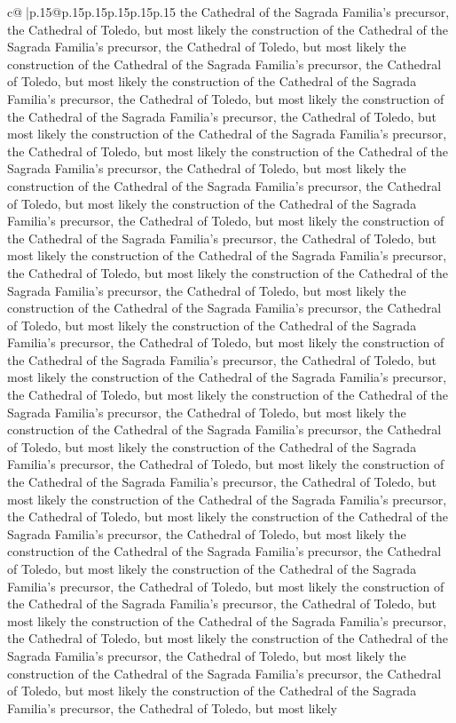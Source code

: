 \documentclass{article}
\begin{document}
{\begin{supertabular}{c@{$\;$}|p{.15\linewidth}@{}p{.15\linewidth}p{.15\linewidth}p{.15\linewidth}p{.15\linewidth}p{.15\linewidth}}
{{{the Cathedral of the Sagrada Familia's precursor, the Cathedral of Toledo, but most likely the construction of the Cathedral of the Sagrada Familia's precursor, the Cathedral of Toledo, but most likely the construction of the Cathedral of the Sagrada Familia's precursor, the Cathedral of Toledo, but most likely the construction of the Cathedral of the Sagrada Familia's precursor, the Cathedral of Toledo, but most likely the construction of the Cathedral of the Sagrada Familia's precursor, the Cathedral of Toledo, but most likely the construction of the Cathedral of the Sagrada Familia's precursor, the Cathedral of Toledo, but most likely the construction of the Cathedral of the Sagrada Familia's precursor, the Cathedral of Toledo, but most likely the construction of the Cathedral of the Sagrada Familia's precursor, the Cathedral of Toledo, but most likely the construction of the Cathedral of the Sagrada Familia's precursor, the Cathedral of Toledo, but most likely the construction of the Cathedral of the Sagrada Familia's precursor, the Cathedral of Toledo, but most likely the construction of the Cathedral of the Sagrada Familia's precursor, the Cathedral of Toledo, but most likely the construction of the Cathedral of the Sagrada Familia's precursor, the Cathedral of Toledo, but most likely the construction of the Cathedral of the Sagrada Familia's precursor, the Cathedral of Toledo, but most likely the construction of the Cathedral of the Sagrada Familia's precursor, the Cathedral of Toledo, but most likely the construction of the Cathedral of the Sagrada Familia's precursor, the Cathedral of Toledo, but most likely the construction of the Cathedral of the Sagrada Familia's precursor, the Cathedral of Toledo, but most likely the construction of the Cathedral of the Sagrada Familia's precursor, the Cathedral of Toledo, but most likely the construction of the Cathedral of the Sagrada Familia's precursor, the Cathedral of Toledo, but most likely the construction of the Cathedral of the Sagrada Familia's precursor, the Cathedral of Toledo, but most likely the construction of the Cathedral of the Sagrada Familia's precursor, the Cathedral of Toledo, but most likely the construction of the Cathedral of the Sagrada Familia's precursor, the Cathedral of Toledo, but most likely the construction of the Cathedral of the Sagrada Familia's precursor, the Cathedral of Toledo, but most likely the construction of the Cathedral of the Sagrada Familia's precursor, the Cathedral of Toledo, but most likely the construction of the Cathedral of the Sagrada Familia's precursor, the Cathedral of Toledo, but most likely the construction of the Cathedral of the Sagrada Familia's precursor, the Cathedral of Toledo, but most likely the construction of the Cathedral of the Sagrada Familia's precursor, the Cathedral of Toledo, but most likely the construction of the Cathedral of the Sagrada Familia's precursor, the Cathedral of Toledo, but most likely the construction of the Cathedral of the Sagrada Familia's precursor, the Cathedral of Toledo, but most likely the construction of the Cathedral of the Sagrada Familia's precursor, the Cathedral of Toledo, but most likely }}}
\end{supertabular}}
\end{document}
